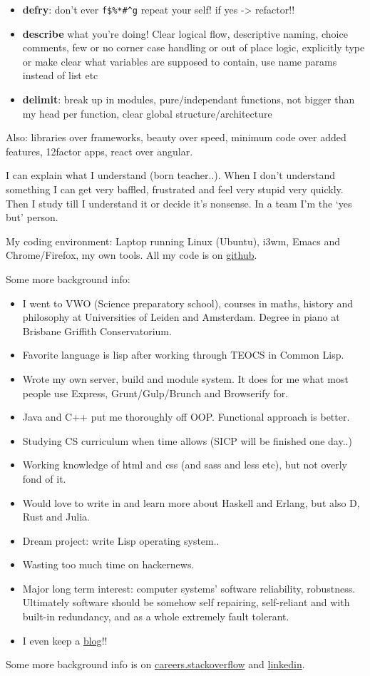 \documentclass[11pt,a4paper,sans]{moderncv}        %
\begin{document}
\begin{itemize}
\item \textbf{defry}: don't ever \verb~f$%*#^g~ repeat your self!
   if yes -> refactor!!
\item \textbf{describe} what you're doing!
   Clear logical flow, descriptive naming, choice comments, few or no corner case handling or out of place logic, explicitly type or make clear what variables are supposed to contain, use name params instead of list etc
\item \textbf{delimit}: break up in modules, pure/independant functions, not bigger than my head per function, clear global structure/architecture
\end{itemize}

Also: libraries over frameworks, beauty over speed, minimum code over added features, 12factor apps, react over angular.

I can explain what I understand (born teacher..). When I don't understand something I can get very baffled, frustrated and feel very stupid very quickly. Then I study till I understand it or decide it's nonsense. In a team I'm the `yes but' person. 

My coding environment: Laptop running Linux (Ubuntu), i3wm, Emacs and Chrome/Firefox, my own tools. All my code is on \href{http://github.com/michieljoris}{github}.

Some more background info:

\begin{itemize}
\item I went to VWO (Science preparatory school), courses in maths, history and philosophy at Universities of Leiden and Amsterdam. Degree in piano at Brisbane Griffith Conservatorium.
\item Favorite language is lisp after working through TEOCS in Common Lisp.
\item Wrote my own server, build and module system. It does for me what most people use Express, Grunt/Gulp/Brunch and Browserify for.
\item Java and C++ put me thoroughly off OOP. Functional approach is better.
\item Studying CS curriculum when time allows (SICP will be finished one day..)
\item Working knowledge of html and css (and sass and less etc), but not overly fond of it.
\item Would love to write in and learn more about Haskell and Erlang, but also D, Rust and Julia.
\item Dream project: write Lisp operating system..
\item Wasting too much time on hackernews.
\item Major long term interest: computer systems' software reliability, robustness. Ultimately
  software should be somehow self repairing, self-reliant and with built-in
  redundancy, and as a whole extremely fault tolerant.
\item I even keep a \href{http://www.axion5.net}{blog}!!
\end{itemize}
  
Some more background info is on \href{http://careers.stackoverflow.com/michieljoris}{careers.stackoverflow} and \href{http://nl.linkedin.com/in/michieljoris/}{linkedin}.


\makeletterclosing
\end{document}
